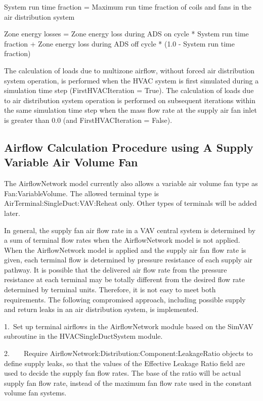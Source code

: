 System run time fraction = Maximum run time fraction of coils and fans in the air distribution system

Zone energy losses = Zone energy loss during ADS on cycle * System run time fraction + Zone energy loss during ADS off cycle * (1.0 - System run time fraction)

The calculation of loads due to multizone airflow, without forced air distribution system operation, is performed when the HVAC system is first simulated during a simulation time step (FirstHVACIteration = True). The calculation of loads due to air distribution system operation is performed on subsequent iterations within the same simulation time step when the mass flow rate at the supply air fan inlet is greater than 0.0 (and FirstHVACIteration = False).

\subsection{Airflow Calculation Procedure using A Supply Variable Air Volume Fan}\label{airflow-calculation-procedure-using-a-supply-variable-air-volume-fan}

The AirflowNetwork model currently also allows a variable air volume fan type as Fan:VariableVolume. The allowed terminal type is AirTerminal:SingleDuct:VAV:Reheat only. Other types of terminals will be added later.

In general, the supply fan air flow rate in a VAV central system is determined by a sum of terminal flow rates when the AirflowNetwork model is not applied. When the AirflowNetwork model is applied and the supply air fan flow rate is given, each terminal flow is determined by pressure resistance of each supply air pathway. It is possible that the delivered air flow rate from the pressure resistance at each terminal may be totally different from the desired flow rate determined by terminal units. Therefore, it is not easy to meet both requirements. The following compromised approach, including possible supply and return leaks in an air distribution system, is implemented.

1.~Set up terminal airflows in the AirflowNetwork module based on the SimVAV subroutine in the HVACSingleDuctSystem module.

2.~~~~Require AirflowNetwork:Distribution:Component:LeakageRatio objects to define supply leaks, so that the values of the Effective Leakage Ratio field are used to decide the supply fan flow rates. The base of the ratio will be actual supply fan flow rate, instead of the maximum fan flow rate used in the constant volume fan systems.

